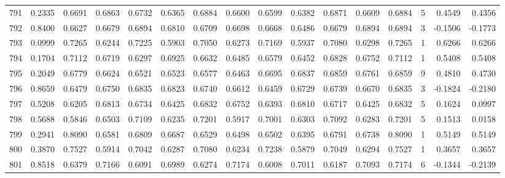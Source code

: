 \begin{tabular}{lrrrrrrrrrrrrrrr}
791 &      0.2335 &  0.6691 &  0.6863 &  0.6732 &  0.6365 &  0.6884 &  0.6600 &  0.6599 &  0.6382 &  0.6871 &   0.6609 &     0.6884 &      5 &                    0.4549 &                     0.4356 \\
792 &      0.8400 &  0.6627 &  0.6679 &  0.6894 &  0.6810 &  0.6709 &  0.6698 &  0.6668 &  0.6486 &  0.6679 &   0.6894 &     0.6894 &      3 &                   -0.1506 &                    -0.1773 \\
793 &      0.0999 &  0.7265 &  0.6244 &  0.7225 &  0.5903 &  0.7050 &  0.6273 &  0.7169 &  0.5937 &  0.7080 &   0.6298 &     0.7265 &      1 &                    0.6266 &                     0.6266 \\
794 &      0.1704 &  0.7112 &  0.6719 &  0.6297 &  0.6925 &  0.6632 &  0.6485 &  0.6579 &  0.6452 &  0.6828 &   0.6752 &     0.7112 &      1 &                    0.5408 &                     0.5408 \\
795 &      0.2049 &  0.6779 &  0.6624 &  0.6521 &  0.6523 &  0.6577 &  0.6463 &  0.6695 &  0.6837 &  0.6859 &   0.6761 &     0.6859 &      9 &                    0.4810 &                     0.4730 \\
796 &      0.8659 &  0.6479 &  0.6750 &  0.6835 &  0.6823 &  0.6740 &  0.6612 &  0.6459 &  0.6729 &  0.6739 &   0.6670 &     0.6835 &      3 &                   -0.1824 &                    -0.2180 \\
797 &      0.5208 &  0.6205 &  0.6813 &  0.6734 &  0.6425 &  0.6832 &  0.6752 &  0.6393 &  0.6810 &  0.6717 &   0.6425 &     0.6832 &      5 &                    0.1624 &                     0.0997 \\
798 &      0.5688 &  0.5846 &  0.6503 &  0.7109 &  0.6235 &  0.7201 &  0.5917 &  0.7001 &  0.6303 &  0.7092 &   0.6283 &     0.7201 &      5 &                    0.1513 &                     0.0158 \\
799 &      0.2941 &  0.8090 &  0.6581 &  0.6809 &  0.6687 &  0.6529 &  0.6498 &  0.6502 &  0.6395 &  0.6791 &   0.6738 &     0.8090 &      1 &                    0.5149 &                     0.5149 \\
800 &      0.3870 &  0.7527 &  0.5914 &  0.7042 &  0.6287 &  0.7080 &  0.6234 &  0.7238 &  0.5879 &  0.7049 &   0.6294 &     0.7527 &      1 &                    0.3657 &                     0.3657 \\
801 &      0.8518 &  0.6379 &  0.7166 &  0.6091 &  0.6989 &  0.6274 &  0.7174 &  0.6008 &  0.7011 &  0.6187 &   0.7093 &     0.7174 &      6 &                   -0.1344 &                    -0.2139 \\

\end{tabular}
